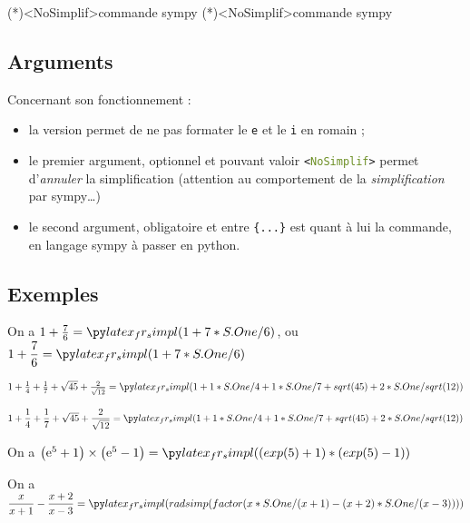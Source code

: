 \documentclass[french,a4paper,11pt]{article}
\newcommand\Cle[1]{{\bfseries\sffamily\textlangle #1\textrangle}}
\begin{document}
\begin{bloctext}
\sympycalc(*)<NoSimplif>{commande sympy}
\dsympycalc(*)<NoSimplif>{commande sympy}
\end{bloctext}

\subsection{Arguments}

\begin{tipblock}
Concernant son fonctionnement :

\begin{itemize}
	\item la version \Cle{*} permet de ne pas formater le \texttt{e} et le \texttt{i} en \textsf{romain} ;
	\item le premier argument, optionnel et pouvant valoir \texttt{<\textcolor{OliveDrab}{NoSimplif}>} permet d'\textit{annuler} la simplification (attention au comportement de la \textit{simplification} par \textsf{sympy}\ldots)
	\item le second argument, obligatoire et entre \texttt{\{...\}} est quant à lui la commande, en langage \textsf{sympy} à passer en \textsf{python}.
\end{itemize}
\vspace*{-\baselineskip}\leavevmode
\end{tipblock}

\subsection{Exemples}

\begin{bloctext}
On a $1+\frac76 = \sympycalc{1+7/6}$, ou $1+\dfrac76 = \dsympycalc{1+7/6}$
\end{bloctext}

\begin{bloctext}
$1+\frac14+\frac17 + \sqrt{45} + \frac{2}{\sqrt{12}} =
\sympycalc{1+1/4+1/7+sqrt(45)+2/sqrt(12)}$

$1+\dfrac14+\dfrac17 + \sqrt{45} + \dfrac{2}{\sqrt{12}} =
\dsympycalc{1+1/4+1/7+sqrt(45)+2/sqrt(12)}$
\end{bloctext}

\begin{bloctext}
On a $\left(\e^5 +1 \right) \times \left(\e^5-1 \right) = \sympycalc{(exp(5)+1)*(exp(5)-1)}$
\end{bloctext}

\begin{bloctext}
On a $\dfrac{x}{x+1} - \dfrac{x+2}{x-3} = \dsympycalc{radsimp(factor(x/(x+1) - (x+2)/(x-3)))}$
\end{bloctext}
\end{document}
